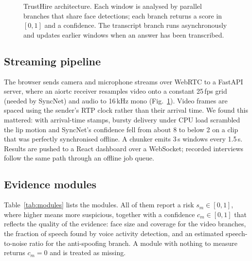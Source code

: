 \documentclass[conference]{IEEEtran}
\begin{document}
\begin{figure}[t]
\caption{TrustHire architecture. Each window is analysed by parallel branches that share face detections; each
branch returns a score in $[0,1]$ and a confidence. The transcript branch runs asynchronously and updates earlier
windows when an answer has been transcribed.}
\label{fig:arch}
\end{figure}

\subsection{Streaming pipeline}

The browser sends camera and microphone streams over WebRTC to a FastAPI server, where an aiortc receiver resamples
video onto a constant 25\,fps grid (needed by SyncNet) and audio to 16\,kHz mono (Fig.~\ref{fig:arch}). Video frames
are spaced using the sender's RTP clock rather than their arrival time. We found this mattered: with arrival-time
stamps, bursty delivery under CPU load scrambled the lip motion and SyncNet's confidence fell from about 8 to below 2 on
a clip that was perfectly synchronised offline. A chunker emits 3\,s windows every 1.5\,s. Results are pushed to a
React dashboard over a WebSocket; recorded interviews follow the same path through an offline job queue.

\subsection{Evidence modules}

Table~\ref{tab:modules} lists the modules. All of them report a risk $s_m\in[0,1]$, where higher means more suspicious,
together with a confidence $c_m\in[0,1]$ that reflects the quality of the evidence: face size and coverage for the video
branches, the fraction of speech found by voice activity detection, and an estimated speech-to-noise ratio for the
anti-spoofing branch. A module with nothing to measure returns $c_m=0$ and is treated as missing.
\end{document}
